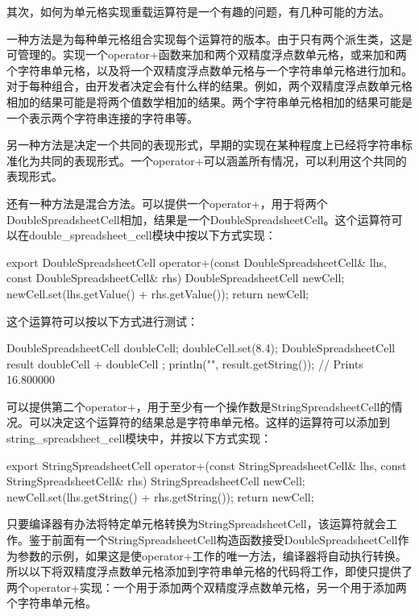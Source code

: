 其次，如何为单元格实现重载运算符是一个有趣的问题，有几种可能的方法。

一种方法是为每种单元格组合实现每个运算符的版本。由于只有两个派生类，这是可管理的。实现一个operator+函数来加和两个双精度浮点数单元格，或来加和两个字符串单元格，以及将一个双精度浮点数单元格与一个字符串单元格进行加和。对于每种组合，由开发者决定会有什么样的结果。例如，两个双精度浮点数单元格相加的结果可能是将两个值数学相加的结果。两个字符串单元格相加的结果可能是一个表示两个字符串连接的字符串等。

另一种方法是决定一个共同的表现形式，早期的实现在某种程度上已经将字符串标准化为共同的表现形式。一个operator+可以涵盖所有情况，可以利用这个共同的表现形式。

还有一种方法是混合方法。可以提供一个operator+，用于将两个DoubleSpreadsheetCell相加，结果是一个DoubleSpreadsheetCell。这个运算符可以在double\_spreadsheet\_cell模块中按以下方式实现：

\begin{cpp}
export DoubleSpreadsheetCell operator+(const DoubleSpreadsheetCell& lhs,
                                       const DoubleSpreadsheetCell& rhs)
{
    DoubleSpreadsheetCell newCell;
    newCell.set(lhs.getValue() + rhs.getValue());
    return newCell;
}
\end{cpp}

这个运算符可以按以下方式进行测试：

\begin{cpp}
DoubleSpreadsheetCell doubleCell; doubleCell.set(8.4);
DoubleSpreadsheetCell result { doubleCell + doubleCell };
println("{}", result.getString()); // Prints 16.800000
\end{cpp}

可以提供第二个operator+，用于至少有一个操作数是StringSpreadsheetCell的情况。可以决定这个运算符的结果总是字符串单元格。这样的运算符可以添加到string\_spreadsheet\_cell模块中，并按以下方式实现：

\begin{cpp}
export StringSpreadsheetCell operator+(const StringSpreadsheetCell& lhs,
                                       const StringSpreadsheetCell& rhs)
{
    StringSpreadsheetCell newCell;
    newCell.set(lhs.getString() + rhs.getString());
    return newCell;
}
\end{cpp}

只要编译器有办法将特定单元格转换为StringSpreadsheetCell，该运算符就会工作。鉴于前面有一个StringSpreadsheetCell构造函数接受DoubleSpreadsheetCell作为参数的示例，如果这是使operator+工作的唯一方法，编译器将自动执行转换。所以以下将双精度浮点数单元格添加到字符串单元格的代码将工作，即使只提供了两个operator+实现：一个用于添加两个双精度浮点数单元格，另一个用于添加两个字符串单元格。

